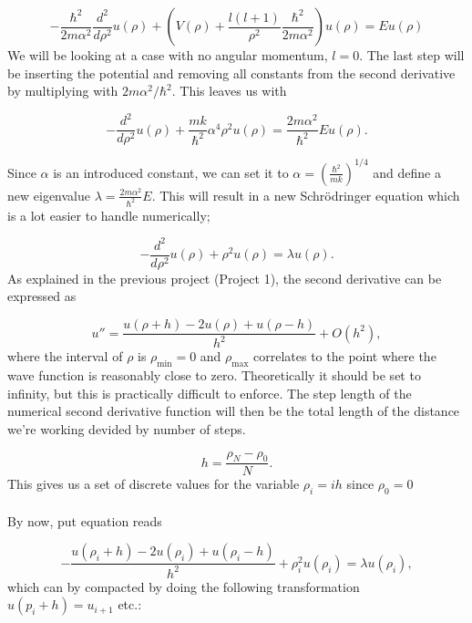 \documentclass[10pt]{article}
\begin{document}
\begin{multicols}{2}
\begin{equation*}
  -\frac{\hbar^2}{2 m \alpha^2} \frac{d^2}{d\rho^2} u(\rho)+ \left ( V(\rho) + \frac{l (l + 1)}{\rho^2}\frac{\hbar^2}{2 m\alpha^2} \right ) u(\rho)  = E u(\rho)
\end{equation*}
We will be looking at a case with no angular momentum, $l=0$. The last step
will be inserting the potential and removing all constants from the second
derivative by multiplying with $2m\alpha^2/\hbar^2$. This leaves us with

\begin{equation*}
  -\frac{d^2}{d\rho^2} u(\rho) 
       + \frac{mk}{\hbar^2} \alpha^4\rho^2u(\rho)  = \frac{2m\alpha^2}{\hbar^2}E u(\rho) .
\end{equation*}

Since $\alpha$ is an introduced constant, we can set it to $\alpha  =
\left(\frac{\hbar^2}{mk}\right)^{1/4}$ and define a new eigenvalue $\lambda
= \frac{2m\alpha^2}{\hbar^2}E$. This will result in a new Schrödringer
equation which is a lot easier to handle numerically;

\begin{equation*}
  -\frac{d^2}{d\rho^2} u(\rho) + \rho^2u(\rho)  = \lambda u(\rho) .
\end{equation*}
As explained in the previous project (Project 1), the second derivative can
be expressed as


\begin{equation}
    u''=\frac{u(\rho+h) -2u(\rho) +u(\rho-h)}{h^2} +O(h^2),
    \label{eq:diffoperation}
\end{equation}
where the interval of $\rho$ is $\rho_{\mathrm{min}}=0$ and
$\rho_{\mathrm{max}}$ correlates to the point where the wave function is
reasonably close to zero. Theoretically it should be set to infinity, but
this is practically difficult to enforce. The step length of the numerical
second derivative function will then be the total length of the distance
we're working devided by number of steps.

\begin{equation*}
  h=\frac{\rho_N-\rho_0 }{N}.
\end{equation*}
This gives us a set of discrete values for the variable $\rho_i = ih$ since
$\rho_0 = 0$\\\\ By now, put equation reads

\begin{equation}
-\frac{u(\rho_i+h) -2u(\rho_i) +u(\rho_i-h)}{h^2}+\rho_i^2u(\rho_i)  = \lambda u(\rho_i),
\end{equation}
which can by compacted by doing the following transformation
$u(p_i+h)=u_{i+1}$ etc.:


\end{multicols}
\end{document}
